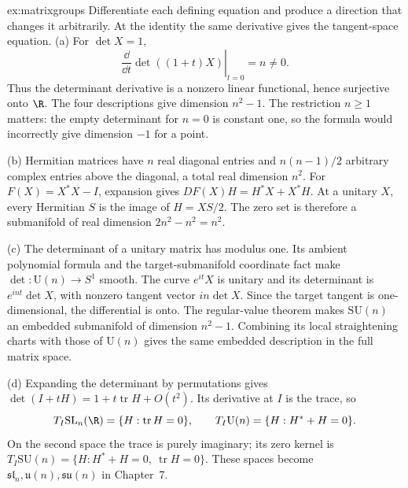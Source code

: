 \begin{solution}{ex:matrixgroups}
\idea Differentiate each defining equation and produce a direction that changes it arbitrarily. At the identity the same derivative gives the tangent-space equation.
\writeup (a) For $\det X=1$,
\[
\left.\frac{\dd}{\dd t}\det((1+t)X)\right|_{t=0}=n\ne0.
\]
Thus the determinant derivative is a nonzero linear functional, hence surjective onto $\R$. The four descriptions give dimension $n^2-1$. The restriction $n\ge1$ matters: the empty determinant for $n=0$ is constant one, so the formula would incorrectly give dimension $-1$ for a point.

(b) Hermitian matrices have $n$ real diagonal entries and $n(n-1)/2$ arbitrary complex entries above the diagonal, a total real dimension $n^2$. For $F(X)=X^*X-I$, expansion gives $DF(X)H=H^*X+X^*H$. At a unitary $X$, every Hermitian $S$ is the image of $H=XS/2$. The zero set is therefore a submanifold of real dimension $2n^2-n^2=n^2$.

(c) The determinant of a unitary matrix has modulus one. Its ambient polynomial formula and the target-submanifold coordinate fact make $\det:\mathrm U(n)\to S^1$ smooth. The curve $e^{it}X$ is unitary and its determinant is $e^{int}\det X$, with nonzero tangent vector $in\det X$. Since the target tangent is one-dimensional, the differential is onto. The regular-value theorem makes $\mathrm{SU}(n)$ an embedded submanifold of dimension $n^2-1$. Combining its local straightening charts with those of $\mathrm U(n)$ gives the same embedded description in the full matrix space.

(d) Expanding the determinant by permutations gives $\det(I+tH)=1+t\operatorname{tr}H+O(t^2)$. Its derivative at $I$ is the trace, so
\[
T_I\mathrm{SL}_n(\R)=\{H:\operatorname{tr}H=0\},\qquad
T_I\mathrm U(n)=\{H:H^*+H=0\}.
\]
On the second space the trace is purely imaginary; its zero kernel is
$T_I\mathrm{SU}(n)=\{H:H^*+H=0,\ \operatorname{tr}H=0\}$. These spaces become $\mathfrak{sl}_n,\mathfrak u(n),\mathfrak{su}(n)$ in Chapter~7.
\end{solution}

